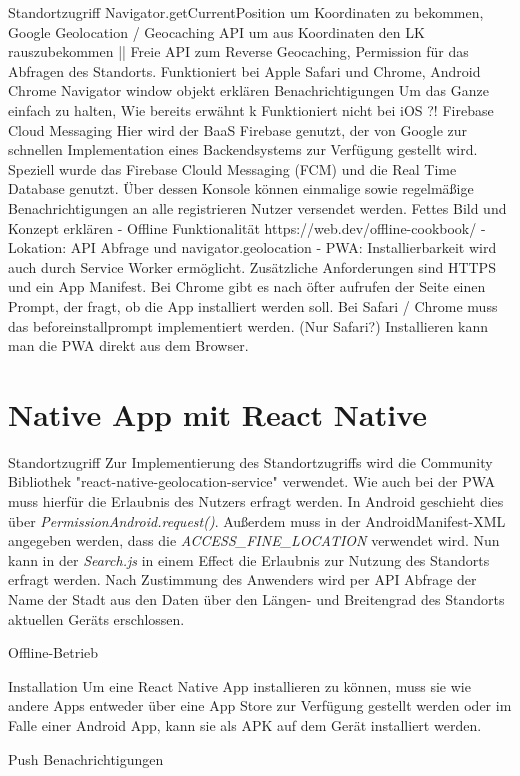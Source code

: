 Standortzugriff
Navigator.getCurrentPosition um Koordinaten zu bekommen, Google Geolocation / Geocaching API um aus Koordinaten den LK rauszubekommen || Freie API zum Reverse Geocaching, Permission für das Abfragen des Standorts. Funktioniert bei Apple Safari und Chrome, Android Chrome
Navigator window objekt erklären
Benachrichtigungen
Um das Ganze einfach zu halten, 
Wie bereits erwähnt k
Funktioniert nicht bei iOS ?!
Firebase Cloud Messaging\cite{Hyun.2018}
Hier wird der BaaS Firebase genutzt, der von Google zur schnellen Implementation eines Backendsystems zur Verfügung gestellt wird. Speziell wurde das Firebase Clould Messaging (FCM) und die Real Time Database genutzt. Über dessen Konsole können einmalige sowie regelmäßige Benachrichtigungen an alle registrieren Nutzer versendet werden. Fettes Bild und Konzept erklären
-	Offline Funktionalität https://web.dev/offline-cookbook/
-	Lokation: API Abfrage und navigator.geolocation
-	PWA: Installierbarkeit wird auch durch Service Worker ermöglicht. Zusätzliche Anforderungen sind HTTPS und ein App Manifest. Bei Chrome gibt es nach öfter aufrufen der Seite einen Prompt, der fragt, ob die App installiert werden soll. Bei Safari / Chrome muss das beforeinstallprompt implementiert werden. (Nur Safari?)
Installieren kann man die PWA direkt aus dem Browser.


\section{Native App mit React Native}
Standortzugriff
Zur Implementierung des Standortzugriffs wird die Community Bibliothek "react-native-geolocation-service" verwendet. Wie auch bei der PWA muss hierfür die Erlaubnis des Nutzers erfragt werden. In Android geschieht dies über \textit{PermissionAndroid.request()}. Außerdem muss in der AndroidManifest-XML  angegeben werden, dass die \textit{ACCESS_FINE_LOCATION} verwendet wird. Nun kann in der \textit{Search.js} in einem Effect die Erlaubnis zur Nutzung des Standorts erfragt werden. Nach Zustimmung des Anwenders wird per API Abfrage der Name der Stadt aus den Daten über den Längen- und Breitengrad des Standorts aktuellen Geräts erschlossen.

Offline-Betrieb

Installation
Um eine React Native App installieren zu können, muss sie wie andere Apps entweder über eine App Store zur Verfügung gestellt werden oder im Falle einer Android App, kann sie als APK auf dem Gerät installiert werden.

Push Benachrichtigungen
